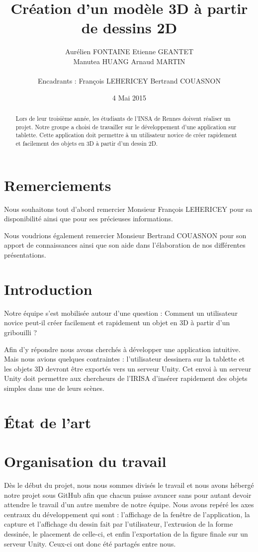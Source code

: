 \documentclass[a4paper,11pt]{article}
\title{ \textbf{Création d'un modèle 3D à partir de dessins 2D} }
\author{ Aurélien \textsc{FONTAINE} Etienne \textsc{GEANTET} \\
	Manutea \textsc{HUANG} Arnaud \textsc{MARTIN} \\
	\\
	Encadrants : François \textsc{LEHERICEY}	Bertrand \textsc{COUASNON}}
\date{4 Mai 2015}                    %
\begin{document}
\maketitle                 %
\thispagestyle{empty}      %

\begin{abstract}
	Lors de leur troisième année, les étudiants de l'INSA de Rennes doivent réaliser un projet. Notre groupe a choisi de travailler sur le développement d'une application sur tablette. Cette application doit permettre à un utilisateur novice de créer rapidement et facilement des objets en 3D à partir d'un dessin 2D. 
\end{abstract}
	
	\section{Remerciements}
		Nous souhaitons tout d'abord remercier Monsieur François LEHERICEY pour sa disponibilité ainsi que pour ses précieuses informations.
		
		Nous voudrions également remercier Monsieur Bertrand COUASNON pour son apport de connaissances ainsi que son aide dans l'élaboration de nos différentes présentations.
				
	\section{Introduction} %
		Notre équipe s'est mobilisée autour d'une question : Comment un utilisateur novice peut-il créer facilement et rapidement un objet en 3D à partir d'un gribouilli ?
		
		Afin d'y répondre nous avons cherchés à développer une application intuitive. Mais nous avions quelques contraintes : l'utilisateur dessinera sur la tablette et les objets 3D devront être exportés vers un serveur Unity. Cet envoi à un serveur Unity doit permettre aux chercheurs de l'IRISA d'insérer rapidement des objets simples dans une de leurs scènes.
	\section{État de l'art}
	\section{Organisation du travail}
	Dès le début du projet, nous nous sommes divisés le travail et nous avons hébergé notre projet sous GitHub afin que chacun puisse avancer sans pour autant devoir attendre le travail d'un autre membre de notre équipe. Nous avons repéré les axes centraux du développement qui sont : l'affichage de la fenêtre de l'application, la capture et l'affichage du dessin fait par l'utilisateur, l'extrusion de la forme dessinée, le placement de celle-ci, et enfin l'exportation de la figure finale sur un serveur Unity. Ceux-ci ont donc été partagés entre nous.
	
\end{document}
